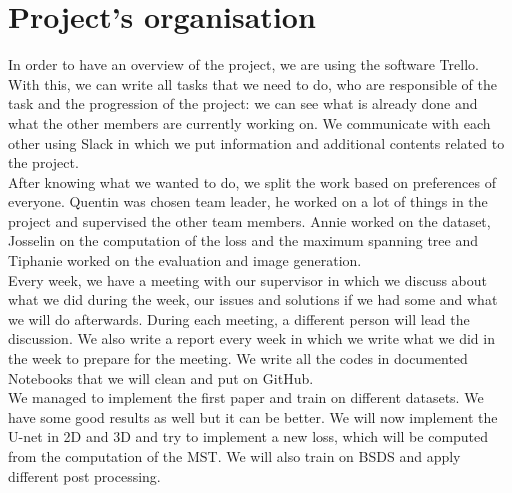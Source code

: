 \documentclass{article}
\begin{document}
\section{Project’s organisation}

In order to have an overview of the project, we are using the software Trello. With this, we can write all tasks that we need to do, who are responsible of the task and the progression of the project: we can see what is already done and what the other members are currently working on. We communicate with each other using Slack in which we put information and additional contents related to the project. \\
After knowing what we wanted to do, we split the work based on preferences of everyone. Quentin was chosen team leader, he worked on a lot of things in the project and supervised the other team members. Annie worked on the dataset, Josselin on the computation of the loss and the maximum spanning tree and Tiphanie worked on the evaluation and image generation. \\

Every week, we have a meeting with our supervisor in which we discuss about what we did during the week, our issues and solutions if we had some and what we will do afterwards. During each meeting, a different person will lead the discussion. We also write a report every week in which we write what we did in the week to prepare for the meeting. We write all the codes in documented Notebooks that we will clean and put on GitHub.\\

We managed to implement the first paper and train on different datasets. We have some good results as well but it can be better. We will now implement the U-net in 2D and 3D and try to implement a new loss, which will be computed from the computation of the MST. We will also train on BSDS and apply different post processing.\\
\end{document}
